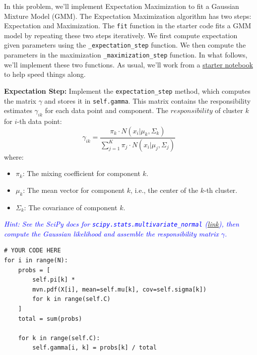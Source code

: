 \documentclass{article}
\begin{document}
\begin{probset}
\begin{prob}
    In this problem, we'll implement Expectation Maximization to fit a Gaussian Mixture Model (GMM). The Expectation Maximization algorithm has two steps: Expectation and Maximization. The \texttt{fit} function in the starter code fits a GMM model by repeating these two steps iteratively. We first compute expectation given parameters using the \texttt{\_expectation\_step} function. We then compute the parameters in the maximization \texttt{\_maximization\_step} function. In what follows, we'll implement these two functions. As usual, we'll work from a \href{https://www.dropbox.com/scl/fi/zuq3kfweu6a79z3kklldc/sp25_PS4_Q6.ipynb?rlkey=xmqmem7htxvttphkeiim7cj8e&st=22lvzy1z&dl=0}{starter notebook} to help speed things along.

    \begin{subprobset}
        \begin{subprob}
            \textbf{Expectation Step:} Implement the \texttt{expectation\_step} method, which computes the matrix $\gamma$ and stores it in \texttt{self.gamma}. This matrix contains the responsibility estimates $\gamma_{ik}$ for each data point and component. The $responsibility$ of cluster $k$ for $i$-th data point:
            \[
            \gamma_{ik} = \frac{\pi_k \cdot N (x_i | \mu_k, \Sigma_k)}{\sum_{j=1}^K \pi_j \cdot N (x_i | \mu_j, \Sigma_j)}
            \]
            where:
            \begin{itemize}
                \item $\pi_k$: The mixing coefficient for component $k$.
                \item $\mu_k$: The mean vector for component $k$, i.e., the center of the $k$-th cluster.
                \item $\Sigma_k$: The covariance of component $k$.
            \end{itemize}
            \textit{\textcolor{blue}{Hint: See the SciPy docs for \texttt{scipy.stats.multivariate\_normal} (\href{https://docs.scipy.org/doc/scipy/reference/generated/scipy.stats.multivariate_normal.html}{\underline{link}}), then compute the Gaussian likelihood and assemble the responsibility matrix $\gamma$.}}

            \begin{verbatim}
# YOUR CODE HERE
for i in range(N):
    probs = [
        self.pi[k] *
        mvn.pdf(X[i], mean=self.mu[k], cov=self.sigma[k])
        for k in range(self.C)
    ]
    total = sum(probs)

    for k in range(self.C):
        self.gamma[i, k] = probs[k] / total
            \end{verbatim}
        \end{subprob}


\end{subprobset}
\end{prob}
\end{probset}
\end{document}

